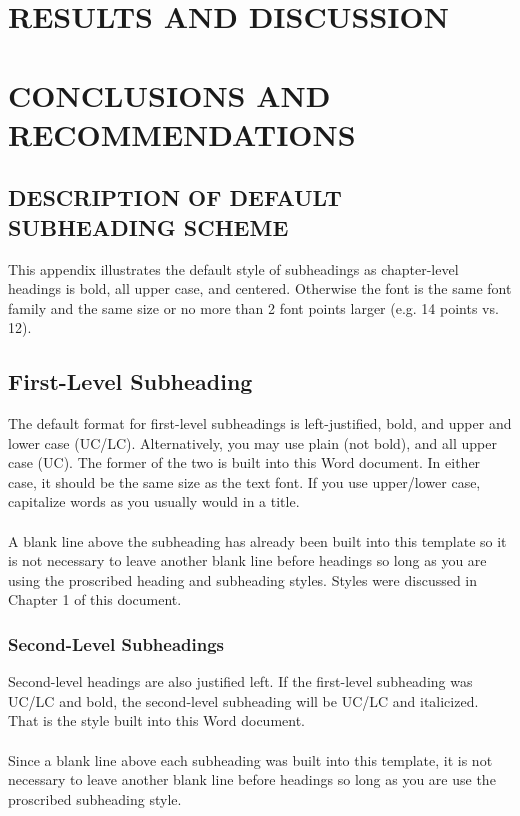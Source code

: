 \documentclass[a4paper, 12pt, twoside]{report}
\theoremstyle{definition}
\begin{document}
\chapter{RESULTS AND DISCUSSION}

\chapter{CONCLUSIONS AND RECOMMENDATIONS}

\begin{onehalfspace}
\printbibliography[heading=bibintoc, title={BIBLIOGRAPHY}]
\end{onehalfspace}

\begin{appendix}
\begin{center}
\chapter {DESCRIPTION OF DEFAULT SUBHEADING SCHEME}
\end{center}
This appendix illustrates the default style of subheadings as chapter-level headings is bold, all upper case, and centered. Otherwise the font is the same font family and the same size or no more than 2 font points larger (e.g. 14 points vs. 12).
\section{First-Level Subheading}
The default format for first-level subheadings is left-justified, bold, and upper and lower case (UC/LC). Alternatively, you may use plain (not bold), and all upper case (UC).  The former of the two is built into this Word document. In either case, it should be the same size as the text font.  If you use upper/lower case, capitalize words as you usually would in a title.\\~\\
	A blank line above the subheading has already been built into this template so it is not necessary to leave another blank line before headings so long as you are using the proscribed heading and subheading styles. Styles were discussed in Chapter 1 of this document.
 \subsection{Second-Level Subheadings}
 Second-level headings are also justified left. If the first-level subheading was UC/LC and bold, the second-level subheading will be UC/LC and italicized. That is the style built into this Word document.\\~\\
	Since a blank line above each subheading was built into this template, it is not necessary to leave another blank line before headings so long as you are use the proscribed subheading style.

\end{appendix}
\end{document}
